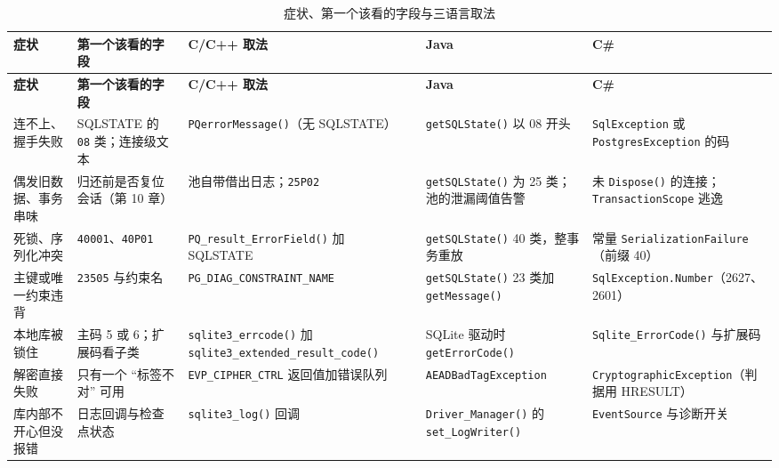 \documentclass[12pt,a4paper,fontset=fandol]{ctexbook}
\newcommand{\Fn}[1]{\texttt{#1()}}
\newcommand{\Tp}[1]{\texttt{#1}}
\newcommand{\CSharp}{C\#}
\newcommand{\CppJava}{C/C++}
\begin{document}
\begin{scriptsize}
\setlength{\tabcolsep}{3pt}
\begin{longtable}{@{}>{\raggedright\arraybackslash}p{}
                  >{\raggedright\arraybackslash}p{}
                  >{\raggedright\arraybackslash}p{}
                  >{\raggedright\arraybackslash}p{}
                  >{\raggedright\arraybackslash}p{}@{}}
\caption{症状、第一个该看的字段与三语言取法}\\
\toprule
\textbf{症状} & \textbf{第一个该看的字段} & \textbf{\CppJava{} 取法} &
\textbf{Java} & \textbf{\CSharp{}} \\
\midrule
\endfirsthead
\toprule
\textbf{症状} & \textbf{第一个该看的字段} & \textbf{\CppJava{} 取法} &
\textbf{Java} & \textbf{\CSharp{}} \\
\midrule
\endhead
连不上、握手失败 & SQLSTATE 的 \Tp{08} 类；连接级文本 &
\Fn{PQ\allowbreak errorMessage}（无 SQLSTATE） &
\Fn{getSQLState} 以 08 开头 &
\Tp{SqlException} 或 \Tp{Postgres\allowbreak Exception} 的码 \\
偶发旧数据、事务串味 & 归还前是否复位会话（第 10 章） &
池自带借出日志；\Tp{25P02} &
\Fn{getSQLState} 为 25 类；池的泄漏阈值告警 &
未 \Fn{Dispose} 的连接；\Tp{Transaction\allowbreak Scope} 逃逸 \\
死锁、序列化冲突 & \Tp{40001}、\Tp{40P01} &
\Fn{PQ\_\allowbreak result\_\allowbreak ErrorField} 加 SQLSTATE &
\Fn{getSQLState} 40 类，整事务重放 &
常量 \Tp{Serialization\allowbreak Failure}（前缀 40） \\
主键或唯一约束违背 & \Tp{23505} 与约束名 &
\Tp{PG\_DIAG\_\allowbreak CONSTRAINT\_\allowbreak NAME} &
\Fn{getSQLState} 23 类加 \Fn{getMessage} &
\Tp{SqlException.\allowbreak Number}（2627、2601） \\
本地库被锁住 & 主码 5 或 6；扩展码看子类 &
\Fn{sqlite3\_errcode} 加
\Fn{sqlite3\_\allowbreak extended\_\allowbreak result\_\allowbreak code} &
SQLite 驱动时 \Fn{getErrorCode} &
\Fn{Sqlite\_\allowbreak ErrorCode} 与扩展码 \\
解密直接失败 & 只有一个 ``标签不对'' 可用 &
\Tp{EVP\_CIPHER\_CTRL} 返回值加错误队列 &
\Tp{AEAD\allowbreak BadTag\allowbreak Exception} &
\Tp{Cryptographic\allowbreak Exception}（判据用 HRESULT） \\
库内部不开心但没报错 & 日志回调与检查点状态 &
\Fn{sqlite3\_log} 回调 &
\Fn{Driver\_\allowbreak Manager} 的 \Fn{set\_\allowbreak LogWriter} &
\Tp{EventSource} 与诊断开关 \\
\bottomrule
\end{longtable}
\end{scriptsize}
\end{document}
